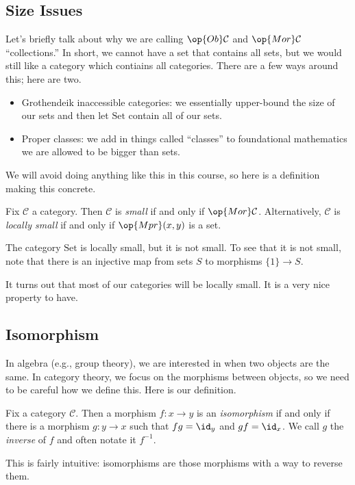 \subsection{Size Issues}
Let's briefly talk about why we are calling $\op{Ob}\mathcal C$ and $\op{Mor}\mathcal C$ ``collections.'' In short, we cannot have a set that contains all sets, but we would still like a category which contiains all categories. There are a few ways around this; here are two.
\begin{itemize}
	\item Grothendeik inaccessible categories: we essentially upper-bound the size of our sets and then let $\mathrm{Set}$ contain all of our sets.
	\item Proper classes: we add in things called ``classes'' to foundational mathematics we are allowed to be bigger than sets.
\end{itemize}
We will avoid doing anything like this in this course, so here is a definition making this concrete.
\begin{definition}
	Fix $\mathcal C$ a category. Then $\mathcal C$ is \textit{small} if and only if $\op{Mor}\mathcal C$. Alternatively, $\mathcal C$ is \textit{locally small} if and only if $\op{Mpr}(x,y)$ is a set.
\end{definition}
\begin{example}
	The category $\mathrm{Set}$ is locally small, but it is not small. To see that it is not small, note that there is an injective map from sets $S$ to morphisms $\{1\}\to S$.
\end{example}
It turns out that most of our categories will be locally small. It is a very nice property to have.

\subsection{Isomorphism}
In algebra (e.g., group theory), we are interested in when two objects are the same. In category theory, we focus on the morphisms between objects, so we need to be careful how we define this. Here is our definition.
\begin{definition}[Isomorphism]
	Fix a category $\mathcal C$. Then a morphism $f:x\to y$ is an \textit{isomorphism} if and only if there is a morphism $g:y\to x$ such that $fg=\id_y$ and $gf=\id_x$. We call $g$ the \textit{inverse} of $f$ and often notate it $f^{-1}$.
\end{definition}
\noindent This is fairly intuitive: isomorphisms are those morphisms with a way to reverse them.

